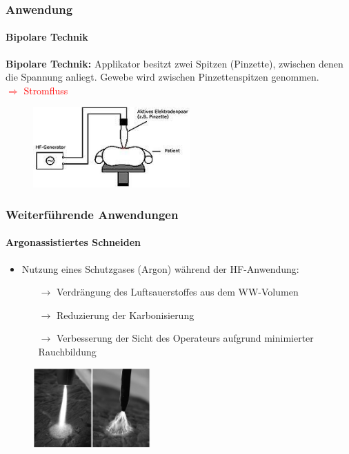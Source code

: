 \documentclass{beamer}
\begin{document}
\begin{frame}
\frametitle{Anwendung}
\framesubtitle{Bipolare Technik}
\textbf{Bipolare Technik:}
Applikator besitzt zwei Spitzen (Pinzette), zwischen denen die Spannung anliegt. Gewebe wird zwischen Pinzettenspitzen genommen. \\\textcolor{red}{$\Rightarrow$ Stromfluss}
\begin{figure}
	\centering
	\includegraphics[width=6cm]{images/_bipolareTechnik.png}
	\cite{wiki:HF}
\end{figure}
\end{frame}


\begin{frame}
\frametitle{Weiterführende Anwendungen}
\framesubtitle{Argonassistiertes Schneiden}
\begin{itemize}
	\item Nutzung eines Schutzgases (Argon) während der HF-Anwendung:
	\begin{itemize}
		\item [$\rightarrow$]Verdrängung des Luftsauerstoffes aus dem WW-Volumen
		\item [$\rightarrow$]Reduzierung der Karbonisierung
		\item [$\rightarrow$]Verbesserung der Sicht des Operateurs aufgrund minimierter Rauchbildung
	\end{itemize}
	\vspace{0.2cm}
\end{itemize}
\begin{figure}
	\centering
	\includegraphics[width=4.5cm]{images/argon.png}
	\cite{kramme2016medizintechnik}
\end{figure}
\end{frame}
\end{document}
